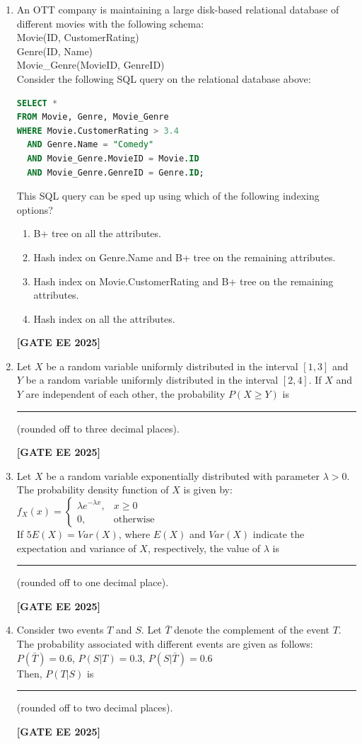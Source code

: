 \documentclass[journal]{IEEEtran}
\newcommand{\qfooter}{%
  \begin{flushright}\footnotesize\textbf{[GATE EE 2025]}\end{flushright}\vspace{1em}%
}
\begin{document}
\begin{enumerate}[leftmargin=*,label=\arabic*.]
\item An OTT company is maintaining a large disk-based relational database of different movies with the following schema:\\
Movie(ID, CustomerRating)\\
Genre(ID, Name)\\
Movie\_Genre(MovieID, GenreID)\\
Consider the following SQL query on the relational database above:
\begin{lstlisting}[language=SQL]
SELECT *
FROM Movie, Genre, Movie_Genre
WHERE Movie.CustomerRating > 3.4
  AND Genre.Name = "Comedy"
  AND Movie_Genre.MovieID = Movie.ID
  AND Movie_Genre.GenreID = Genre.ID;
\end{lstlisting}
This SQL query can be sped up using which of the following indexing options?
\begin{enumerate}
\item B+ tree on all the attributes.
\item Hash index on Genre.Name and B+ tree on the remaining attributes.
\item Hash index on Movie.CustomerRating and B+ tree on the remaining attributes.
\item Hash index on all the attributes.
\end{enumerate} 
\qfooter


\item Let $X$ be a random variable uniformly distributed in the interval $[1, 3]$ and $Y$ be a random variable uniformly distributed in the interval $[2, 4]$. If $X$ and $Y$ are independent of each other, the probability $P(X\geq Y)$ is \rule{7em}{0.07em} (rounded off to three decimal places).
\qfooter

\item Let $X$ be a random variable exponentially distributed with parameter $\lambda > 0$. The probability density function of $X$ is given by:\\
$f_X(x) = \begin{cases} \lambda e^{-\lambda x}, & x\geq 0\\ 0, & \text{otherwise} \end{cases}$\\
If $5E(X) = Var(X)$, where $E(X)$ and $Var(X)$ indicate the expectation and variance of $X$, respectively, the value of $\lambda$ is \rule{7em}{0.07em} (rounded off to one decimal place).
\qfooter

\item Consider two events $T$ and $S$. Let $\bar{T}$ denote the complement of the event $T$. The probability associated with different events are given as follows:\\
$P(\bar{T}) = 0.6$, $P(S|T) = 0.3$, $P(S|\bar{T}) = 0.6$\\
Then, $P(T|S)$ is \rule{6em}{0.07em} (rounded off to two decimal places).
\qfooter


\end{enumerate}
\end{document}
